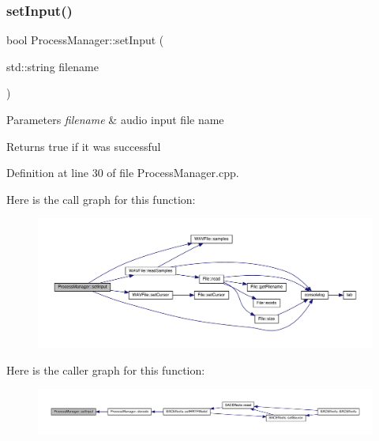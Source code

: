 \subsubsection{\texorpdfstring{set\+Input()}{setInput()}}
{\footnotesize\ttfamily bool Process\+Manager\+::set\+Input (\begin{DoxyParamCaption}\item[{std\+::string}]{filename }\end{DoxyParamCaption})}


\begin{DoxyParams}{Parameters}
{\em filename} & audio input file name \\
\hline
\end{DoxyParams}
\begin{DoxyReturn}{Returns}
true if it was successful 
\end{DoxyReturn}


Definition at line 30 of file Process\+Manager.\+cpp.

Here is the call graph for this function\+:
\nopagebreak
\begin{figure}[H]
\begin{center}
\leavevmode
\includegraphics[width=350pt]{class_process_manager_a830d46989b28e8c4b37f4bcf94dc76a4_cgraph}
\end{center}
\end{figure}
Here is the caller graph for this function\+:
\nopagebreak
\begin{figure}[H]
\begin{center}
\leavevmode
\includegraphics[width=350pt]{class_process_manager_a830d46989b28e8c4b37f4bcf94dc76a4_icgraph}
\end{center}
\end{figure}
\mbox{\label{class_process_manager_aa2deb4f60f83a490ed7520d2ce926626}} 
